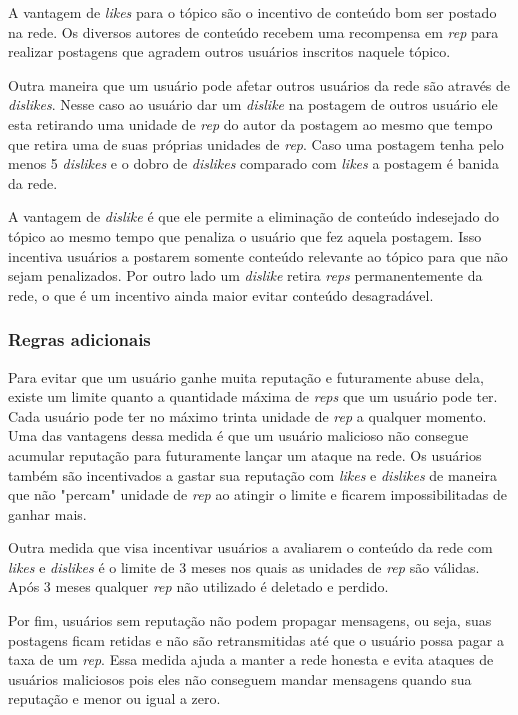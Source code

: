 \documentclass[12pt]{article}
\begin{document}
A vantagem de \emph{likes} para o tópico são o incentivo de conteúdo  bom ser postado na rede. Os diversos autores de conteúdo recebem uma recompensa em \emph{rep} para realizar postagens que agradem outros usuários inscritos naquele tópico.

Outra maneira que um usuário pode afetar outros usuários da rede são através de \emph{dislikes}. Nesse caso ao usuário dar um \emph{dislike} na postagem de outros usuário ele esta retirando uma unidade de \emph{rep} do autor da postagem ao mesmo que tempo que retira uma de suas próprias unidades de \emph{rep}. Caso uma postagem tenha pelo menos 5 \emph{dislikes} e o dobro de \emph{dislikes} comparado com \emph{likes} a postagem é banida da rede.  

A vantagem de \emph{dislike} é que ele permite a eliminação de conteúdo indesejado do tópico ao mesmo tempo que penaliza o usuário que fez aquela postagem. Isso incentiva usuários a postarem somente conteúdo relevante ao tópico para que não sejam penalizados. Por outro lado um \emph{dislike} retira \emph{reps} permanentemente da rede, o que é um incentivo ainda maior evitar conteúdo desagradável.

\subsubsection{Regras adicionais} \label{subsubsec:+regras}

Para evitar que um usuário ganhe muita reputação e futuramente abuse dela, existe um limite quanto a quantidade máxima de \emph{reps} que um usuário pode ter. Cada usuário pode ter no máximo trinta unidade de \emph{rep} a qualquer momento. Uma das vantagens dessa medida é que um usuário malicioso não consegue acumular reputação para futuramente lançar um ataque na rede. Os usuários também são incentivados a gastar sua reputação com \emph{likes} e \emph{dislikes} de maneira que não "percam" unidade de \emph{rep} ao atingir o limite e ficarem impossibilitadas de ganhar mais.

Outra medida que visa incentivar usuários a avaliarem o conteúdo da rede com \emph{likes} e \emph{dislikes} é o limite de 3 meses nos quais as unidades de \emph{rep} são válidas. Após 3 meses qualquer \emph{rep} não utilizado é deletado e perdido. 

Por fim, usuários sem reputação não podem propagar mensagens, ou seja, suas postagens ficam retidas e não são retransmitidas até que o usuário possa pagar a taxa de um \emph{rep}. Essa medida ajuda a manter a rede honesta e evita ataques de usuários maliciosos pois eles não conseguem mandar mensagens quando sua reputação e menor ou igual a zero.
\end{document}
